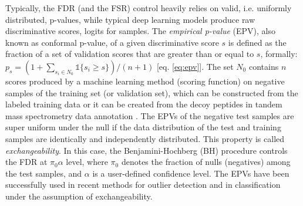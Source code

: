 \documentclass{article}
\newcommand{\mathone}{\mathds{1}}
\begin{document}
Typically, the FDR (and the FSR) control heavily relies on valid, i.e. uniformly distributed, p-values, while typical deep learning models produce raw discriminative scores, logits for samples. %
The {\em empirical p-value} (EPV), also known as conformal p-value, of a given discriminative score $s$ is defined as the fraction of a set of validation scores that are greater than or equal to $s$, formally: $p_s=(1+\sum_{s_i\in N_0} \mathone\{s_i \ge s\})/(n+1) \label{eq:epv}$ [eq. \ref{eq:epv}]. The set $N_0$ contains $n$ scores produced by a machine learning method (scoring function) on negative samples of the training set (or validation set), which can be constructed from the labeled training data or it can be created from the decoy peptides in tandem mass spectrometry data annotation \cite{elias2007target,danilova2019bias}. The EPVs of the negative test samples are super uniform under the null if the data distribution of the test and training samples are identically and independently distributed. This property is called {\em exchangeability}. In this case, the Benjamini-Hochberg (BH) procedure controls the FDR at $\pi_0\alpha$ level, where $\pi_0$ denotes the fraction of nulls (negatives) among the test samples, and $\alpha$ is a user-defined confidence level. The EPVs have been successfully used in recent methods for outlier detection \cite{bates2023testing,marandon2023adaptive} and in classification \cite{rava2021burden, angelopoulos2021learn} under the assumption of exchangeability. %
\end{document}
